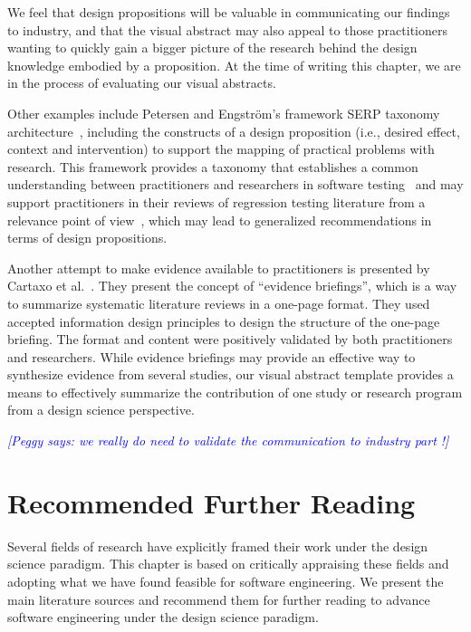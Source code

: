 \documentclass[graybox]{svmult}
\newcommand{\peggy}[1]{\textcolor{blue}{{\it [Peggy says: #1]}}}
\newcommand{\peggy}[1]{}
\begin{document}
We feel that design propositions will be valuable in communicating our findings to industry, and that the visual abstract may also appeal to those practitioners wanting to quickly gain a bigger picture of the research behind the design knowledge embodied by a proposition. 
At the time of writing this chapter, we are in the process of evaluating our visual abstracts.

Other examples include Petersen and Engstr\"om's framework SERP taxonomy architecture~\cite{petersen_finding_2014}, including the constructs of a design proposition  
(i.e., desired effect, context and intervention) to support the mapping of practical problems with research. 
This framework provides a taxonomy that establishes a common understanding between practitioners and researchers in software testing~\cite{engstrom_SERP-test_2017} and may support practitioners in their reviews of regression testing literature from a relevance point of view~\cite{ali_search_2019}, which may lead to generalized recommendations in terms of design propositions. 

Another attempt to make evidence available to practitioners is presented by Cartaxo et al.~\cite{Cartaxo2016}. 
They present the concept of ``evidence briefings'', which is a way to summarize systematic literature reviews in a one-page format. 
They used accepted information design principles to design the structure of the one-page briefing. The format and content were positively validated by both practitioners and researchers. While evidence briefings may provide an effective way to synthesize evidence from several studies, our visual abstract template provides a means to effectively summarize the contribution of one study or research program from a design science perspective.

\peggy{we really do need to validate the communication to industry part !}



\section{Recommended Further Reading}
\label{sec:reading}
Several fields of research have explicitly framed their work under the design science paradigm. This chapter is based on critically appraising these fields and adopting what we have found feasible for software engineering. We present the main literature sources and recommend them for further reading to advance software engineering under the design science paradigm.
\end{document}
